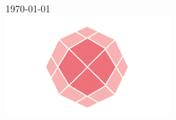 \begin{titlepage}

{\large \today}\\[2cm] %


\includegraphics{logo/rosa_logo.png}\\[1cm] %
 

\vfill %

\end{titlepage}